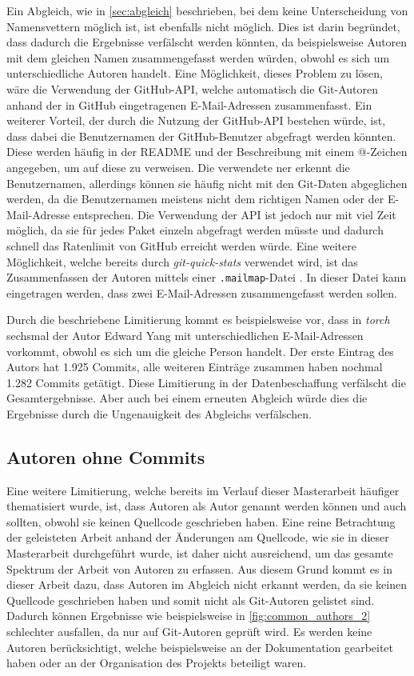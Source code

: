 Ein Abgleich, wie in \autoref{sec:abgleich} beschrieben, bei dem keine Unterscheidung von Namensvettern möglich ist, ist ebenfalls nicht möglich. 
Dies ist darin begründet, dass dadurch die Ergebnisse verfälscht werden könnten, da beispielsweise Autoren mit dem gleichen Namen zusammengefasst werden würden, obwohl es sich um unterschiedliche Autoren handelt.
Eine Möglichkeit, dieses Problem zu lösen, wäre die Verwendung der GitHub-API, welche automatisch die Git-Autoren anhand der in GitHub eingetragenen E-Mail-Adressen zusammenfasst.
Ein weiterer Vorteil, der durch die Nutzung der GitHub-API bestehen würde, ist, dass dabei die Benutzernamen der GitHub-Benutzer abgefragt werden könnten.
Diese werden häufig in der README und der Beschreibung mit einem @-Zeichen angegeben, um auf diese zu verweisen.
Die verwendete \gls{ner} erkennt die Benutzernamen, allerdings können sie häufig nicht mit den Git-Daten abgeglichen werden, da die Benutzernamen meistens nicht dem richtigen Namen oder der E-Mail-Adresse entsprechen.
Die Verwendung der API ist jedoch nur mit viel Zeit möglich, da sie für jedes Paket einzeln abgefragt werden müsste und dadurch schnell das Ratenlimit von GitHub erreicht werden würde.
Eine weitere Möglichkeit, welche bereits durch \emph{git-quick-stats} verwendet wird, ist das Zusammenfassen der Autoren mittels einer \texttt{.mailmap}-Datei \autocite{chacon_git_2024-1}.
In dieser Datei kann eingetragen werden, dass zwei E-Mail-Adressen zusammengefasst werden sollen.

Durch die beschriebene Limitierung kommt es beispielsweise vor, dass in \emph{torch} sechsmal der Autor \glqq Edward Yang\grqq{} mit unterschiedlichen E-Mail-Adressen vorkommt, obwohl es sich um die gleiche Person handelt.
Der erste Eintrag des Autors hat 1.925 Commits, alle weiteren Einträge zusammen haben nochmal 1.282 Commits getätigt.
Diese Limitierung in der Datenbeschaffung verfälscht die Gesamtergebnisse.
Aber auch bei einem erneuten Abgleich würde dies die Ergebnisse durch die Ungenauigkeit des Abgleichs verfälschen.

\subsection*{Autoren ohne Commits}
\label{subsec:autoren_ohne_commits}
Eine weitere Limitierung, welche bereits im Verlauf dieser Masterarbeit häufiger thematisiert wurde, ist, dass Autoren als Autor genannt werden können und auch sollten, obwohl sie keinen Quellcode geschrieben haben.
Eine reine Betrachtung der geleisteten Arbeit anhand der Änderungen am Quellcode, wie sie in dieser Masterarbeit durchgeführt wurde, ist daher nicht ausreichend, um das gesamte Spektrum der Arbeit von Autoren zu erfassen.
Aus diesem Grund kommt es in dieser Arbeit dazu, dass Autoren im Abgleich nicht erkannt werden, da sie keinen Quellcode geschrieben haben und somit nicht als Git-Autoren gelistet sind.
Dadurch können Ergebnisse wie beispielsweise in \autoref{fig:common_authors_2} schlechter ausfallen, da nur auf Git-Autoren geprüft wird.
Es werden keine Autoren berücksichtigt, welche beispielsweise an der Dokumentation gearbeitet haben oder an der Organisation des Projekts beteiligt waren.

